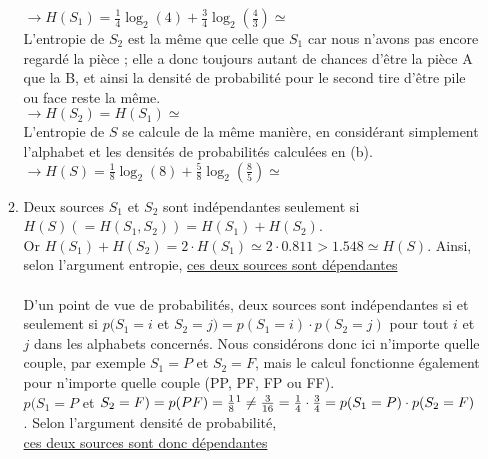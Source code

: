 \documentclass[12pt,a4paper]{article}
\begin{document}
\begin{enumerate}
\begin{enumerate}[label=(\alph*)]
		$\to H(S_1) = \frac{1}{4}\log_2(4) + \frac{3}{4}\log_2(\frac{4}{3}) \simeq$\\
		L'entropie de $S_2$ est la même que celle que $S_1$ car nous n'avons pas encore regardé la pièce ; elle a donc toujours autant de chances d'être la pièce A que la B, et ainsi la densité de probabilité pour le second tire d'être pile ou face reste la même.\\
		$\to H(S_2) = H(S_1) \simeq$ \\
		L'entropie de $S$ se calcule de la même manière, en considérant simplement l'alphabet et les densités de probabilités calculées en (b).\\
		$\to H(S) = \frac{1}{8}\log_2(8) + \frac{5}{8}\log_2(\frac{8}{5}) \simeq$ 
		\item Deux sources $S_1$ et $S_2$ sont indépendantes seulement si $H(S) (= H(S_1,S_2)) = H(S_1) + H(S_2)$.\\
		Or $H(S_1)+H(S_2) = 2\cdot H(S_1) \simeq 2\cdot 0.811 > 1.548 \simeq H(S)$. Ainsi, selon l'argument entropie, \underline{ces deux sources sont dépendantes}\\
		\\
		D'un point de vue de probabilités, deux sources sont indépendantes si et seulement si $p(S_1 = i$ et $S_2 = j) = p(S_1 = i)\cdot p(S_2=j)$ pour tout $i$ et $j$ dans les alphabets concernés. Nous considérons donc ici n'importe quelle couple, par exemple $S_1 = P$ et $S_2 = F$, mais le calcul fonctionne également pour n'importe quelle couple (PP, PF, FP ou FF).\\
		$p(S_1 = P$ et $S_2 = F) = p(PF) = \frac{1}{8}\footnote{c.f. (b)}\neq \frac{3}{16} = \frac{1}{4}\cdot\frac{3}{4} = p(S_1=P)\cdot p(S_2=F)$. Selon l'argument densité de probabilité, \\\underline{ces deux sources sont donc dépendantes}
		 
			\end{enumerate}
\end{enumerate}
\end{document}
